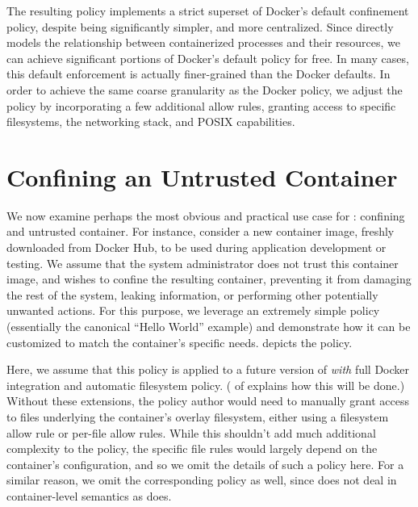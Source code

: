 The resulting \bpfcontain{} policy implements a strict superset of Docker's default
confinement policy, despite being significantly simpler, and more centralized.  Since
\bpfcontain{} directly models the relationship between containerized processes and their
resources, we can achieve significant portions of Docker's default policy for free. In
many cases, this default enforcement is actually finer-grained than the Docker defaults.
In order to achieve the same coarse granularity as the Docker policy, we adjust the
\bpfcontain{} policy by incorporating a few additional allow rules, granting access to
specific filesystems, the networking stack, and POSIX capabilities.

\section{Confining an Untrusted Container}

We now examine perhaps the most obvious and practical use case for \bpfcontain{}:
confining and untrusted container. For instance, consider a new container image, freshly
downloaded from Docker Hub, to be used during application development or testing.  We
assume that the system administrator does not trust this container image, and wishes to
confine the resulting container, preventing it from damaging the rest of the system,
leaking information, or performing other potentially unwanted actions. For this purpose,
we leverage an extremely simple \bpfcontain{} policy (essentially the canonical
\enquote{Hello World} example) and demonstrate how it can be customized to match the
container's specific needs.  depicts the \bpfcontain{} policy.

Here, we assume that this policy is applied to a future version of \bpfcontain{}
\textit{with} full Docker integration and automatic filesystem policy.
( of  explains how this will be
done.) Without these extensions, the policy author would need to manually grant access to
files underlying the container's overlay filesystem, either using a filesystem allow rule
or per-file allow rules. While this shouldn't add much additional complexity to the
policy, the specific file rules would largely depend on the container's configuration, and
so we omit the details of such a policy here. For a similar reason, we omit the
corresponding \bpfbox{} policy as well, since \bpfbox{} does not deal in container-level
semantics as \bpfcontain{} does.


